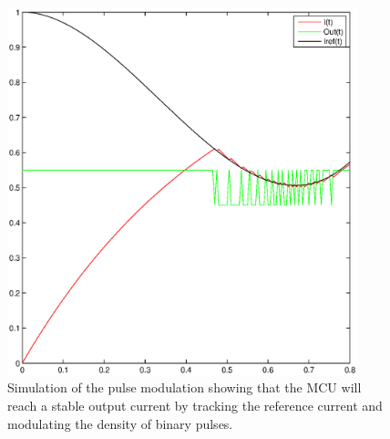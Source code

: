 \begin{figure}[htbp]
\centering
\includegraphics[width=4in]{Graphics/SD}
\caption{Simulation of the pulse modulation showing that the MCU will reach a stable output current by tracking the reference current and modulating the density of binary pulses.}
\end{figure}


